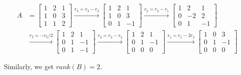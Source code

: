 \documentclass{article}
\begin{document}
    \begin{align*}
        A   &= \begin{bmatrix}
                1 & 2 & 1 \\
                1 & 0 & 3 \\
                1 & 1 & 2
                \end{bmatrix}
            \xrightarrow{r_3 = r_3 - r_2}
            \begin{bmatrix}
                1 & 2 & 1 \\
                1 & 0 & 3 \\
                0 & 1 & -1
            \end{bmatrix}
            \xrightarrow{r_2 = r_2 - r_1}
            \begin{bmatrix}
                1 & 2 & 1 \\
                0 & -2 & 2 \\
                0 & 1 & -1
            \end{bmatrix} \\
            &\xrightarrow{r_2 = -r_2/2}
            \begin{bmatrix}
                1 & 2 & 1 \\
                0 & 1 & -1 \\
                0 & 1 & -1
            \end{bmatrix}
            \xrightarrow{r_3 = r_3 - r_2}
            \begin{bmatrix}
                1 & 2 & 1 \\
                0 & 1 & -1 \\
                0 & 0 & 0
            \end{bmatrix}
            \xrightarrow{r_1 = r_1 - 2r_2}
            \begin{bmatrix}
                1 & 0 & 3 \\
                0 & 1 & -1 \\
                0 & 0 & 0
            \end{bmatrix}
    \end{align*}

    Similarly, we get $rank(B) = 2$.
\end{document}
